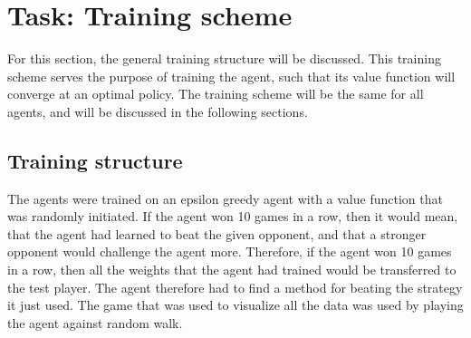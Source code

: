 \chapter{Task: Training scheme} \label{ch:Dominion_engine}
For this section, the general training structure will be discussed. This training scheme serves the purpose of training the agent, such that its value function will converge at an optimal policy. The training scheme will be the same for all agents, and will be discussed in the following sections.

\section{Training structure}
The agents were trained on an epsilon greedy agent with a value function that was randomly initiated. If the agent won 10 games in a row, then it would mean, that the agent had learned to beat the given opponent, and that a stronger opponent would challenge the agent more. Therefore, if the agent won 10 games in a row, then all the weights that the agent had trained would be transferred to the test player. The agent therefore had to find a method for beating the strategy it just used. The game that was used to visualize all the data was used by playing the agent against random walk.
